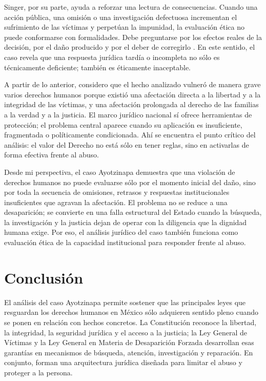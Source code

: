 \documentclass[
	spanish,
	letterpaper, oneside
]{article}
\begin{document}
Singer, por su parte, ayuda a reforzar una lectura de consecuencias. Cuando una acción pública, una omisión o una investigación defectuosa incrementan el sufrimiento de las víctimas y perpetúan la impunidad, la evaluación ética no puede conformarse con formalidades. Debe preguntarse por los efectos reales de la decisión, por el daño producido y por el deber de corregirlo \citep{singerCompendioEtica1995}. En este sentido, el caso revela que una respuesta jurídica tardía o incompleta no sólo es técnicamente deficiente; también es éticamente inaceptable.

A partir de lo anterior, considero que el hecho analizado vulneró de manera grave varios derechos humanos porque existió una afectación directa a la libertad y a la integridad de las víctimas, y una afectación prolongada al derecho de las familias a la verdad y a la justicia. El marco jurídico nacional sí ofrece herramientas de protección; el problema central aparece cuando su aplicación es insuficiente, fragmentada o políticamente condicionada. Ahí se encuentra el punto crítico del análisis: el valor del Derecho no está sólo en tener reglas, sino en activarlas de forma efectiva frente al abuso.

Desde mi perspectiva, el caso Ayotzinapa demuestra que una violación de derechos humanos no puede evaluarse sólo por el momento inicial del daño, sino por toda la secuencia de omisiones, retrasos y respuestas institucionales insuficientes que agravan la afectación. El problema no se reduce a una desaparición; se convierte en una falla estructural del Estado cuando la búsqueda, la investigación y la justicia dejan de operar con la diligencia que la dignidad humana exige. Por eso, el análisis jurídico del caso también funciona como evaluación ética de la capacidad institucional para responder frente al abuso.

\section{Conclusión}

El análisis del caso Ayotzinapa permite sostener que las principales leyes que resguardan los derechos humanos en México sólo adquieren sentido pleno cuando se ponen en relación con hechos concretos. La Constitución reconoce la libertad, la integridad, la seguridad jurídica y el acceso a la justicia; la Ley General de Víctimas y la Ley General en Materia de Desaparición Forzada desarrollan esas garantías en mecanismos de búsqueda, atención, investigación y reparación. En conjunto, forman una arquitectura jurídica diseñada para limitar el abuso y proteger a la persona.
\end{document}
